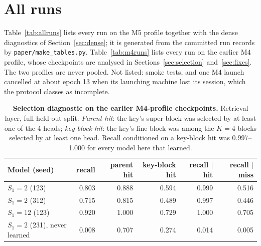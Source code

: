 \section{All runs}
\label{app:runs}

Table~\ref{tab:allruns} lists every run on the M5 profile together with the dense diagnostics of
Section~\ref{sec:dense}; it is generated from the committed run records by \texttt{paper/make\_tables.py}.
Table~\ref{tab:m4runs} lists every run on the earlier M4 profile, whose checkpoints are analysed in
Sections~\ref{sec:selection} and~\ref{sec:fixes}. The two profiles are never pooled. Not listed: smoke tests, and one M4 launch cancelled at about epoch 13 when its
launching machine lost its session, which the protocol classes as incomplete.



\begin{table}[h]
\centering
\small
\begin{tabular}{lrrrrr}
\toprule
Model (seed) & recall & parent hit & key-block hit & recall $\mid$ hit & recall $\mid$ miss \\
\midrule
$S_1{=}2$ (123) & 0.803 & 0.888 & 0.594 & 0.999 & 0.516 \\
$S_1{=}2$ (312) & 0.715 & 0.815 & 0.489 & 0.997 & 0.446 \\
$S_1{=}12$ (123) & 0.920 & 1.000 & 0.729 & 1.000 & 0.705 \\
$S_1{=}2$ (231), never learned & 0.008 & 0.707 & 0.274 & 0.014 & 0.005 \\
\bottomrule
\end{tabular}
\caption{\textbf{Selection diagnostic on the earlier M4-profile checkpoints.} Retrieval layer, full held-out split. \emph{Parent hit}: the key's super-block was selected by at least one of the 4 heads;
\emph{key-block hit}: the key's fine block was among the $K{=}4$ blocks selected by at least one head. Recall conditioned on a key-block hit
was 0.997--1.000 for every model here that learned.}
\label{tab:selection_m4}
\end{table}

